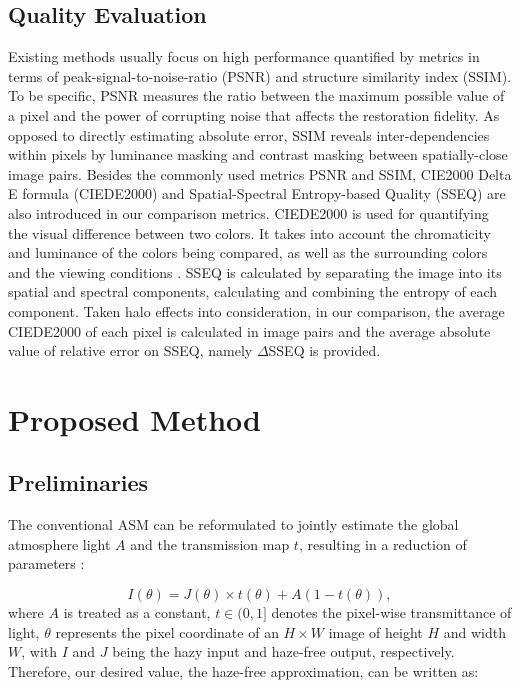 \documentclass[lettersize,journal]{IEEEtran}
\begin{document}
\subsection{Quality Evaluation}
Existing methods usually focus on high performance quantified by metrics in terms of peak-signal-to-noise-ratio (PSNR) and structure similarity index (SSIM). To be specific, PSNR measures the ratio between the maximum possible value of a pixel and the power of corrupting noise that affects the restoration fidelity. As opposed to directly estimating absolute error, SSIM reveals inter-dependencies within pixels by luminance masking and contrast masking between spatially-close image pairs. Besides the commonly used metrics PSNR and SSIM, CIE2000 Delta E formula (CIEDE2000) and Spatial-Spectral Entropy-based Quality (SSEQ) are also introduced in our comparison metrics. CIEDE2000 is used for quantifying the visual difference between two colors. It takes into account the chromaticity and luminance of the colors being compared, as well as the surrounding colors and the viewing conditions \cite{luo2001ciede2000}. SSEQ is calculated by separating the image into its spatial and spectral components, calculating and combining the entropy of each component\cite{liu2014sseq}. Taken halo effects into consideration, in our comparison, the average CIEDE2000 of each pixel is calculated in image pairs and the average absolute value of relative error on SSEQ, namely $\Delta$SSEQ is provided. 

\section{Proposed Method}
\subsection{Preliminaries}
The conventional ASM can be reformulated to jointly estimate the global atmosphere light $A$ and the transmission map $t$, resulting in a reduction of parameters \cite{li2017aod}:

\begin{equation}
    \label{deqn_ex1}
    I(\theta) = J(\theta) \times t(\theta) + A(1 - t(\theta)),
\end{equation}
where $A$ is treated as a constant, $t\in (0,1]$ denotes the pixel-wise transmittance of light, $\theta$ represents the pixel coordinate of an $H \times W$ image of height $H$ and width $W$, with $I$ and $J$ being the hazy input and haze-free output, respectively. Therefore, our desired value, the haze-free approximation, can be written as:
\end{document}

